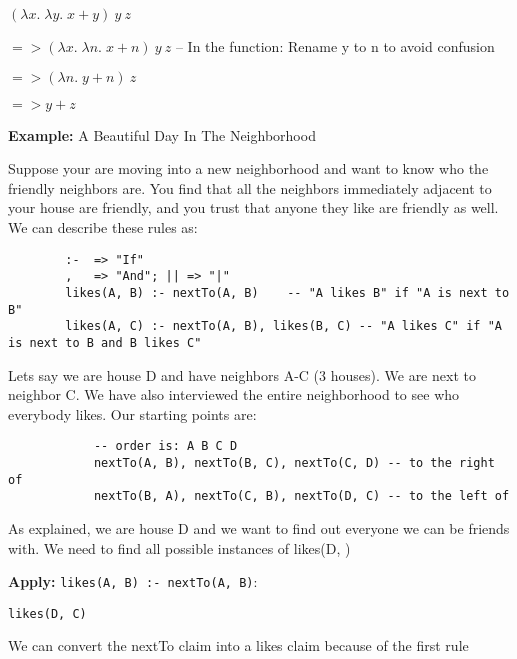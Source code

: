 \documentclass{article}
\begin{document}
        \smallskip
        $(\lambda x.\; \lambda y.\; x + y)\: y\: z$ 
        
        \smallskip
        $=> (\lambda x.\; \lambda n.\; x + n)\: y\: z$ -- In the function: Rename y to n to avoid confusion
        
        \smallskip
        $=> (\lambda n.\; y + n)\: z$
        
        \smallskip
        $=> y + z$
        
        \bigskip
        \textbf{Example:} A Beautiful Day In The Neighborhood
        
        \medskip\noindent
        Suppose your are moving into a new neighborhood and want to know who the friendly neighbors are. You find that all the neighbors immediately adjacent to your house are friendly, and you trust that anyone they like are friendly as well. We can describe these rules as:
        
        \begin{lstlisting}
        :-  => "If"
        ,   => "And"; || => "|"
        likes(A, B) :- nextTo(A, B)    -- "A likes B" if "A is next to B"
        likes(A, C) :- nextTo(A, B), likes(B, C) -- "A likes C" if "A is next to B and B likes C"
        \end{lstlisting}
        
        \medskip\noindent
        Lets say we are house D and have neighbors A-C (3 houses). We are next to neighbor C. We have also interviewed the entire neighborhood to see who everybody likes. Our starting points are:
        
        \begin{lstlisting}
            -- order is: A B C D
            nextTo(A, B), nextTo(B, C), nextTo(C, D) -- to the right of
            nextTo(B, A), nextTo(C, B), nextTo(D, C) -- to the left of
        \end{lstlisting}
        
        \medskip\noindent
        As explained, we are house D and we want to find out everyone we can be friends with. We need to find all possible instances of likes(D, \textunderscore)
        
        \bigskip
        \textbf{Apply:} \lstinline{likes(A, B) :- nextTo(A, B)}:
        
            \medskip
            \lstinline{likes(D, C)}
            
            \medskip
            We can convert the nextTo claim into a likes claim because of the first rule
            
\end{document}
